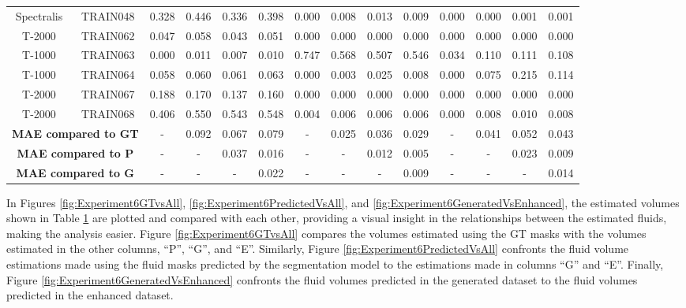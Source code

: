 \begin{table}[!ht]
{\begin{tabular}{|c|c|cccc|cccc|cccc|}
		Spectralis & TRAIN048 & 0.328 & 0.446 & 0.336 & 0.398 & 0.000 & 0.008 & 0.013 & 0.009 & 0.000 & 0.000 & 0.001 & 0.001 \\

		T-2000 & TRAIN062 & 0.047 & 0.058 & 0.043 & 0.051 & 0.000 & 0.000 & 0.000 & 0.000 & 0.000 & 0.000 & 0.000 & 0.000 \\

		T-1000 & TRAIN063 & 0.000 & 0.011 & 0.007 & 0.010 & 0.747 & 0.568 & 0.507 & 0.546 & 0.034 & 0.110 & 0.111 & 0.108 \\
		
		T-1000 & TRAIN064 & 0.058 & 0.060 & 0.061 & 0.063 & 0.000 & 0.003 & 0.025 & 0.008 & 0.000 & 0.075 & 0.215 & 0.114 \\

		T-2000 & TRAIN067 & 0.188 & 0.170 & 0.137 & 0.160 & 0.000 & 0.000 & 0.000 & 0.000 & 0.000 & 0.000 & 0.000 & 0.000 \\

		T-2000 & TRAIN068 & 0.406 & 0.550 & 0.543 & 0.548 & 0.004 & 0.006 & 0.006 & 0.006 & 0.000 & 0.008 & 0.010 & 0.008 \\
		
		\hline
		\multicolumn{2}{|c|}{\textbf{MAE compared to GT}} & - & 0.092 & 0.067 & 0.079 & - & 0.025 & 0.036 & 0.029 & - & 0.041 & 0.052 & 0.043 \\ 
		\multicolumn{2}{|c|}{\textbf{MAE compared to P}} & - & - & 0.037 & 0.016 & - & - & 0.012 & 0.005 & - & - & 0.023 & 0.009 \\
		\multicolumn{2}{|c|}{\textbf{MAE compared to G}} & - & - & - & 0.022 & - & - & - & 0.009 & - & - & - & 0.014 \\ 
		\hline
		
	\end{tabular}}
	\label{tab:FluidVolumesExperiment6}
\end{table}

In Figures \ref{fig:Experiment6GTvsAll}, \ref{fig:Experiment6PredictedVsAll}, and \ref{fig:Experiment6GeneratedVsEnhanced}, the estimated volumes shown in Table \ref{tab:FluidVolumesExperiment6} are plotted and compared with each other, providing a visual insight in the relationships between the estimated fluids, making the analysis easier. Figure \ref{fig:Experiment6GTvsAll} compares the volumes estimated using the GT masks with the volumes estimated in the other columns, ``P'', ``G'', and ``E''. Similarly, Figure \ref{fig:Experiment6PredictedVsAll} confronts the fluid volume estimations made using the fluid masks predicted by the segmentation model to the estimations made in columns ``G'' and ``E''. Finally, Figure \ref{fig:Experiment6GeneratedVsEnhanced} confronts the fluid volumes predicted in the generated dataset to the fluid volumes predicted in the enhanced dataset.

